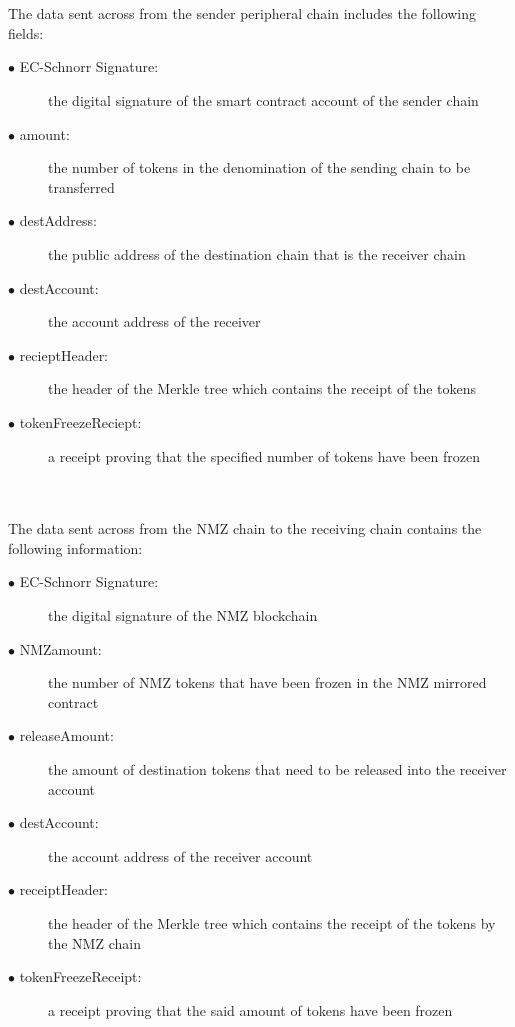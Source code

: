 \documentclass[a4paper,twoside,phd]{BYUPhys}
\begin{document}
\\
\\
The data sent across from the sender peripheral chain includes the following fields:
\begin{description}
    \item[$\bullet$ EC-Schnorr Signature:] the digital signature of the smart contract account of the sender chain
    \item[$\bullet$ amount:] the number of tokens in the denomination of the sending chain to be transferred
    \item[$\bullet$ destAddress:] the public address of the destination chain that is the receiver chain
    \item[$\bullet$ destAccount:] the account address of the receiver
    \item[$\bullet$ recieptHeader:] the header of the Merkle tree which contains the receipt of the tokens
    \item[$\bullet$ tokenFreezeReciept:] a receipt proving that the specified number of tokens have been frozen
\end{description}
\\
\\
The data sent across from the NMZ chain to the receiving chain contains the following information:
\begin{description}
    \item[$\bullet$ EC-Schnorr Signature:] the digital signature of the NMZ blockchain
    \item[$\bullet$ NMZamount:] the number of NMZ tokens that have been frozen in the NMZ mirrored contract
    \item[$\bullet$ releaseAmount:] the amount of destination tokens that need to be released into the receiver account
    \item[$\bullet$ destAccount:] the account address of the receiver account
    \item[$\bullet$ receiptHeader:] the header of the Merkle tree which contains the receipt of the tokens by the NMZ chain
    \item[$\bullet$ tokenFreezeReceipt:] a receipt proving that the said amount of tokens have been frozen
\end{description}
\end{document}
